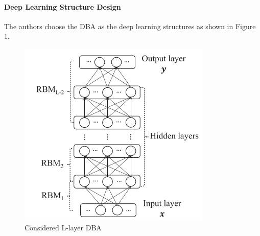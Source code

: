 \documentclass[11pt]{report}
\begin{document}
	\paragraph{Deep Learning Structure Design}
	The authors choose the DBA as the deep learning structures as shown in Figure 1.
	\begin{figure}[h!]
		\centering
		\includegraphics[width=0.5\linewidth]{figure1.png}
		\caption{Considered L-layer DBA}
		\label{fig-label}
	\end{figure}
	
\end{document}
